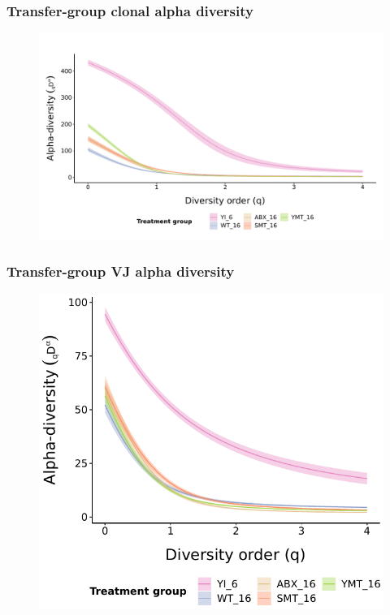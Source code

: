 \documentclass[presentation]{beamer}
\newlength{\slideheight}
\begin{document}
\begin{frame}
\frametitle{Transfer-group clonal alpha diversity}
\begin{figure}
\includegraphics[height=\slideheight]{figs/pdf/extra/igseq-gut-clone-diversity-alpha-groups}
\end{figure}
\end{frame}

\begin{frame}
\frametitle{Transfer-group VJ alpha diversity}
\begin{figure}
\includegraphics[height=\slideheight]{figs/pdf/extra/igseq-gut-VJ-diversity-alpha-groups}
\end{figure}
\end{frame}
\end{document}

